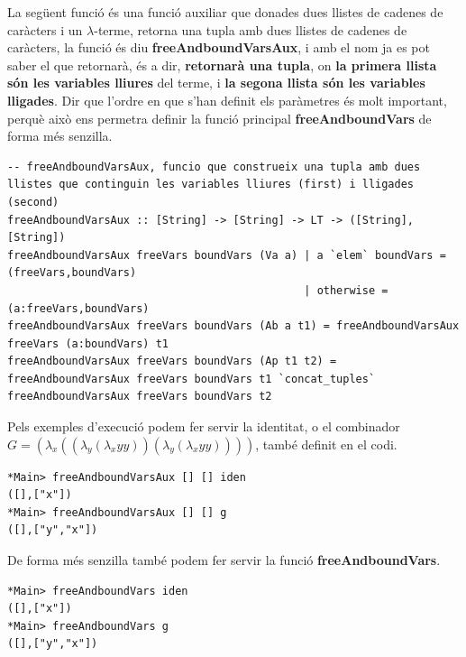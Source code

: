 \documentclass[10pt,a4paper]{article}
\begin{document}
La següent funció és una funció auxiliar que donades dues llistes de cadenes de caràcters i un $\lambda$-terme, retorna una tupla amb dues llistes de cadenes de caràcters, la funció és diu \textbf{freeAndboundVarsAux}, i amb el nom ja es pot saber el que retornarà, és a dir, \textbf{retornarà una tupla}, on \textbf{la primera llista són les variables lliures} del terme, i \textbf{la segona llista són les variables lligades}. Dir que l'ordre en que s'han definit els paràmetres és molt important, perquè això ens permetra definir la funció principal \textbf{freeAndboundVars} de forma més senzilla.

\lstset{language=Haskell, breaklines=true, basicstyle=\footnotesize}
\begin{lstlisting}[frame=mystyle]
-- freeAndboundVarsAux, funcio que construeix una tupla amb dues llistes que continguin les variables lliures (first) i lligades (second)
freeAndboundVarsAux :: [String] -> [String] -> LT -> ([String],[String])
freeAndboundVarsAux freeVars boundVars (Va a) | a `elem` boundVars = (freeVars,boundVars)
                                              | otherwise = (a:freeVars,boundVars)
freeAndboundVarsAux freeVars boundVars (Ab a t1) = freeAndboundVarsAux freeVars (a:boundVars) t1
freeAndboundVarsAux freeVars boundVars (Ap t1 t2) = freeAndboundVarsAux freeVars boundVars t1 `concat_tuples` freeAndboundVarsAux freeVars boundVars t2
\end{lstlisting}

\clearpage

Pels exemples d'execució podem fer servir la identitat, o el combinador $G = (\lambda_x ((\lambda_y (\lambda_x  y y)) (\lambda_y (\lambda_x  y y))))$, també definit en el codi.

\lstset{language=Haskell, breaklines=true, basicstyle=\footnotesize}
\begin{lstlisting}[frame=mystyle]
*Main> freeAndboundVarsAux [] [] iden
([],["x"])
*Main> freeAndboundVarsAux [] [] g
([],["y","x"])
\end{lstlisting}

De forma més senzilla també podem fer servir la funció \textbf{freeAndboundVars}.

\lstset{language=Haskell, breaklines=true, basicstyle=\footnotesize}
\begin{lstlisting}[frame=mystyle]
*Main> freeAndboundVars iden
([],["x"])
*Main> freeAndboundVars g
([],["y","x"])
\end{lstlisting}
\end{document}
